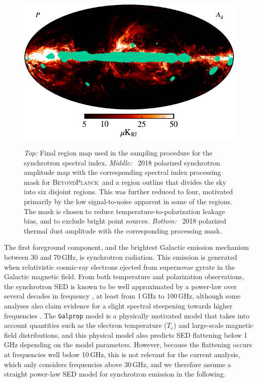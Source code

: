 \documentclass[twocolumn]{aa}
\newcommand{\BP}{\textsc{BeyondPlanck}}
\newcommand{\?}[1]{\textcolor{red}{{\bf [#1]}}}
\begin{document}
\begin{figure}[t]
\includegraphics[width=\linewidth]{figs/dust_P_dx12_T_w12_n1024_cb_masked_c-gist_heat.pdf}\\ 
\caption{\emph{Top:} Final region map used in the sampling procedure
  for the synchrotron spectral index. \emph{Middle:} \Planck\ 2018
  polarized synchrotron amplitude map with the corresponding spectral
  index processing mask for \BP\ and a region outline that divides the sky into
  six disjoint regions. This was further reduced to four, motivated
  primarily by the low signal-to-noise apparent in some of the
  regions. The mask is chosen to reduce temperature-to-polarization
  leakage bias, and to exclude bright point sources. \emph{Bottom:}
  \Planck\ 2018 polarized thermal dust amplitude with the
  corresponding processing mask.}\label{fig:regions}
\end{figure}

The first foreground component, and the brightest Galactic emission mechanism
between 30 and 70\,GHz, is synchrotron radiation. This emission is generated
when relativistic cosmic-ray electrons ejected from supernovae gyrate in the
Galactic magnetic field. From both temperature and polarization observations,
the synchrotron SED is known to be well approximated by a power-law over several
decades in frequency \citep[e.g.,][]{lawson1987, reich1988, Platania2003,
Davies2006, gold2009}, at least from 1\,GHz to 100\,GHz, although some analyses
also claim evidence for a slight spectral steepening towards higher frequencies
\citep{kogut:2012,jew2019}. The \texttt{Galprop} model \citep{orlando:2018} is a
physically motivated model that takes into account quantities such as the
electron temperature ($T_e$) and large-scale magnetic field distributions, and
this physical model also predicts SED flattening below 1\,GHz depending on the
model parameters. However, because the flattening occurs at frequencies well
below 10\,GHz, this is not relevant for the current analysis, which only
considers frequencies above 30\,GHz, and we therefore assume a straight
power-law SED model for synchrotron emission in the following.
\end{document}

